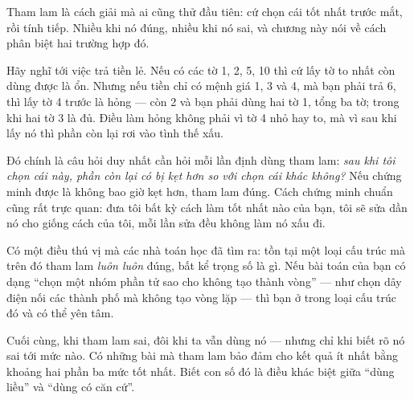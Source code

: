 \documentclass[../../algorithm.tex]{subfiles}
\begin{document}
\begin{dongian}
Tham lam là cách giải mà ai cũng thử đầu tiên: cứ chọn cái tốt nhất trước mắt, rồi tính tiếp. Nhiều khi nó đúng, nhiều khi nó sai, và chương này nói về cách phân biệt hai trường hợp đó.

Hãy nghĩ tới việc trả tiền lẻ. Nếu có các tờ 1, 2, 5, 10 thì cứ lấy tờ to nhất còn dùng được là ổn. Nhưng nếu tiền chỉ có mệnh giá 1, 3 và 4, mà bạn phải trả 6, thì lấy tờ 4 trước là hỏng --- còn 2 và bạn phải dùng hai tờ 1, tổng ba tờ; trong khi hai tờ 3 là đủ. Điều làm hỏng không phải vì tờ 4 nhỏ hay to, mà vì sau khi lấy nó thì phần còn lại rơi vào tình thế xấu.

Đó chính là câu hỏi duy nhất cần hỏi mỗi lần định dùng tham lam: \emph{sau khi tôi chọn cái này, phần còn lại có bị kẹt hơn so với chọn cái khác không?} Nếu chứng minh được là không bao giờ kẹt hơn, tham lam đúng. Cách chứng minh chuẩn cũng rất trực quan: đưa tôi bất kỳ cách làm tốt nhất nào của bạn, tôi sẽ sửa dần nó cho giống cách của tôi, mỗi lần sửa đều không làm nó xấu đi.

Có một điều thú vị mà các nhà toán học đã tìm ra: tồn tại một loại cấu trúc mà trên đó tham lam \emph{luôn luôn} đúng, bất kể trọng số là gì. Nếu bài toán của bạn có dạng ``chọn một nhóm phần tử sao cho không tạo thành vòng'' --- như chọn dây điện nối các thành phố mà không tạo vòng lặp --- thì bạn ở trong loại cấu trúc đó và có thể yên tâm.

Cuối cùng, khi tham lam sai, đôi khi ta vẫn dùng nó --- nhưng chỉ khi biết rõ nó sai tới mức nào. Có những bài mà tham lam bảo đảm cho kết quả ít nhất bằng khoảng hai phần ba mức tốt nhất. Biết con số đó là điều khác biệt giữa ``dùng liều'' và ``dùng có căn cứ''.
\end{dongian}
\end{document}
